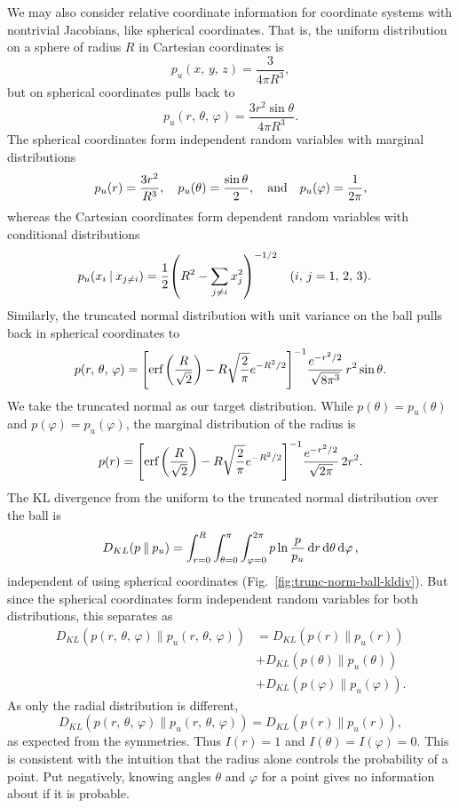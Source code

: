 \documentclass[aps,reprint,floatfix]{revtex4-2}
\renewcommand\mathrm\textnormal%
\theoremstyle{plain}
\theoremstyle{definition}
\renewcommand\phi\varphi%
\renewcommand\ln{\operatorname{\mathrm{ln}}}
\begin{document}
We may also consider relative coordinate information for coordinate systems with
nontrivial Jacobians, like spherical coordinates. That is, the uniform
distribution on a sphere of radius $R$ in Cartesian coordinates is
\[
  p_u(x,\, y,\, z)
  = \frac{3}{4\pi R^3},
\]
but on spherical coordinates pulls back to
\[
  p_u(r,\, \theta,\, \varphi)
  = \frac{3r^2 \sin\theta}{4\pi R^3}.
\]
The spherical coordinates form independent random variables with marginal
distributions
\[
  p_u(r)
  = \frac{3r^2}{R^3} \qc
  p_u(\theta)
  = \frac{\sin\theta}{2}, \qand
  p_u(\varphi)
  = \frac{1}{2\pi},
\]
whereas the Cartesian coordinates form dependent random variables with
conditional distributions
\[
  p_u(x_i \mathbin{|} x_{j \ne i})
  = \frac{1}{2}{\qty(R^2 - \sum_{j \ne i} x_j^2)}^{-1/2}
  \qq{($i,\, j = 1,\, 2,\, 3$).}
\]
Similarly, the truncated normal distribution with unit variance on the ball
pulls back in spherical coordinates to
\[
  p(r,\, \theta,\, \varphi)
  = {\qty[\mathop{\mathrm{erf}}\qty(\frac{R}{\sqrt{2}})
  - R\sqrt{\frac{2}{\pi}}e^{-R^2 / 2}]}^{-1}
  \frac{e^{-r^2 / 2}}{\sqrt{8\pi^3}}\, r^2 \sin\theta.
\]
We take the truncated normal as our target distribution. While $p(\theta) =
p_u(\theta)$ and $p(\varphi) = p_u(\varphi)$, the marginal distribution of the
radius is
\[
  p(r)
  = {\qty[\mathop{\mathrm{erf}}\qty(\frac{R}{\sqrt{2}})
  - R\sqrt{\frac{2}{\pi}}e^{-R^2 / 2}]}^{-1}
  \frac{e^{-r^2 / 2}}{\sqrt{2\pi}}\, 2r^2.
\]
The KL divergence from the uniform to the truncated normal distribution over the
ball is
\[
  D_{KL}(p \mathbin\| p_u)
  = \int_{r=0}^R \int_{\theta=0}^\pi \int_{\varphi=0}^{2\pi} p \ln
  \frac{p}{p_u} \dd{r}\dd{\theta}\dd{\varphi},
\]
independent of using spherical coordinates
(Fig.~\ref{fig:trunc-norm-ball-kldiv}). But since the spherical coordinates form
independent random variables for both distributions, this separates as
\begin{align}
  D_{KL}(p(r,\, \theta,\, \varphi) \mathbin\| p_u(r,\, \theta,\, \varphi))
  &= D_{KL}(p(r) \mathbin\| p_u(r)) \\
  &+ D_{KL}(p(\theta) \mathbin\| p_u(\theta)) \\
  &+ D_{KL}(p(\varphi) \mathbin\| p_u(\varphi)).
\end{align}
As only the radial distribution is different,
\[
  D_{KL}(p(r,\, \theta,\, \varphi) \mathbin\| p_u(r,\, \theta,\, \varphi))
  = D_{KL}(p(r) \mathbin\| p_u(r)),
\]
as expected from the symmetries. Thus $I(r) = 1$ and $I(\theta) = I(\phi) = 0$.
This is consistent with the intuition that the radius alone controls the
probability of a point. Put negatively, knowing angles $\theta$ and $\phi$ for a
point gives no information about if it is probable.
\end{document}
